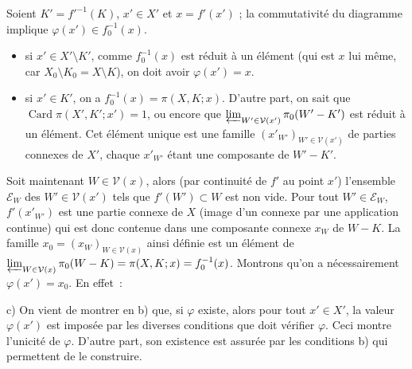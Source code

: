 Soient $K' = {f'}^{-1}(K)$, $x' \in X'$ et $x = f'(x')$ ; la commutativité du diagramme implique $\varphi(x') \in f_0^{-1}(x)$.
\begin{itemize}
	\item[a)] si $x' \in X' \setminus K'$, comme $f_0^{-1}(x)$ est réduit à un élément (qui est $x$ lui même, car $X_0 \setminus K_0 = X \setminus K$), on doit avoir $\varphi(x') = x$.
	\item[b)] si $x' \in K'$, on a $f_0^{-1}(x) = \pi(X,K;x)$. D'autre part, on sait que $\operatorname{Card} \pi(X',K';x') = 1$, ou encore que $\varprojlim_{W' \in \mathcal{V}(x')} \pi_0(W'-K')$ est réduit à un élément. Cet élément unique est une famille $(x'_{W'})_{W' \in \mathcal{V}(x')}$ de parties connexes de $X'$, chaque $x'_{W'}$ étant une composante de $W'-K'$.
\end{itemize}
Soit maintenant $W \in \mathcal{V}(x)$, alors (par continuité de $f'$ au point $x'$) l'ensemble $\mathcal{E}_W$ des $W' \in \mathcal{V}(x')$ tels que $f'(W') \subset W$ est non vide. Pour tout $W' \in \mathcal{E}_W$, $f'(x'_{W'})$ est une partie connexe de $X$ (image d'un connexe par une application continue) qui est donc contenue dans une composante connexe $x_W$ de $W-K$. La famille $x_0 = (x_W)_{W \in \mathcal{V}(x)}$ ainsi définie est un élément de $\varprojlim_{W \in \mathcal{V}(x)} \pi_0(W-K) = \pi(X,K;x) = f_0^{-1}(x)$. Montrons qu'on a nécessairement $\varphi(x') = x_0$. En effet~:
c) On vient de montrer en b) que, si $\varphi$ existe, alors pour tout $x' \in X'$, la valeur $\varphi(x')$ est imposée par les diverses conditions que doit vérifier $\varphi$. Ceci montre l'unicité de $\varphi$. D'autre part, son existence est assurée par les conditions b) qui permettent de le construire.

